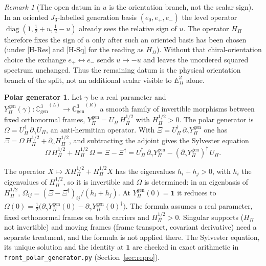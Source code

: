 \documentclass[11pt]{article}
\theoremstyle{definition}
\newtheorem*{polargen}{Polar generator}
\theoremstyle{remark}
\newtheorem{remark}{Remark}
\newcommand{\Jthree}{J_{3}}
\newcommand{\Cgen}{\mathbb{C}^{3}_{\mathrm{gen}}}
\newcommand{\Epi}{E_{\Pi}}
\newcommand{\GL}{{\Cgen}^{(L)}}
\newcommand{\GR}{{\Cgen}^{(R)}}
\newcommand{\Ygen}{{Y^{\mathrm{gen}}_{\Pi}}}
\newcommand{\Hpi}{H_{\Pi}}
\newcommand{\Upi}{U_{\Pi}}
\newcommand{\Opol}{\Omega}
\newcommand{\diag}{\operatorname{diag}}
\begin{document}
    \begin{remark}[The open datum in $u$ is the orientation branch, not the scalar sign]
      \label{rem:orientation}
      In an oriented $\Jthree$-labelled generation basis $(e_0, e_+, e_-)$ the level operator
      $\diag(1, \tfrac12 + u, \tfrac12 - u)$ already sees the relative sign of $u$.
      The operator $\Hpi$ therefore fixes the sign of $u$ only after such an oriented basis has been chosen
      (under [H-Res] and [H-Sq] for the reading as $\Hpi$).
      Without that chiral-orientation choice the exchange $e_+ \leftrightarrow e_-$ sends $u \mapsto -u$ and
      leaves the unordered squared spectrum unchanged.
      Thus the remaining datum is the physical orientation branch of the split, not an additional scalar
      visible to $\Epi^{2}$ alone.
    \end{remark}
    \begin{polargen}
      Let $\gamma$ be a real parameter and $\Ygen(\gamma) : \GL \to \GR$ a smooth family of invertible morphisms
      between fixed orthonormal frames, $\Ygen = \Upi\,\Hpi^{1/2}$ with $\Hpi^{1/2} > 0$.
      The polar generator is $\Opol = \Upi^{\dagger}\,\partial_{\gamma}\Upi$, an anti-hermitian operator.
      With $\Xi = \Upi^{\dagger}\,\partial_{\gamma}\Ygen$ one has
      $\Xi = \Opol\,\Hpi^{1/2} + \partial_{\gamma}\Hpi^{1/2}$, and subtracting the adjoint gives the Sylvester equation
      \[
        \Opol\,\Hpi^{1/2} + \Hpi^{1/2}\,\Opol = \Xi - \Xi^{\dagger}
        = \Upi^{\dagger}\,\partial_{\gamma}\Ygen - (\partial_{\gamma}\Ygen)^{\dagger}\,\Upi .
      \]
    \end{polargen}

    The operator $X \mapsto X\Hpi^{1/2} + \Hpi^{1/2}X$ has the eigenvalues $h_{i} + h_{j} > 0$, with $h_{i}$ the
    eigenvalues of $\Hpi^{1/2}$, so it is invertible and $\Opol$ is determined: in an eigenbasis of $\Hpi^{1/2}$,
    $\Opol_{ij} = (\Xi - \Xi^{\dagger})_{ij}/(h_{i} + h_{j})$.
    At $\Ygen(0) = \mathbf{1}$ it reduces to $\Opol(0) = \tfrac12\big(\partial_{\gamma}\Ygen(0) -
    \partial_{\gamma}\Ygen(0)^{\dagger}\big)$.
    The formula assumes a real parameter, fixed orthonormal frames on both carriers and $\Hpi^{1/2} > 0$.
    Singular supports ($\Hpi$ not invertible) and moving frames (frame transport, covariant derivative) need a separate
    treatment, and the formula is not applied there.
    The Sylvester equation, its unique solution and the identity at $\mathbf{1}$ are checked in exact arithmetic in
    \texttt{front\_polar\_generator.py} (Section~\ref{sec:repro}).
\end{document}
